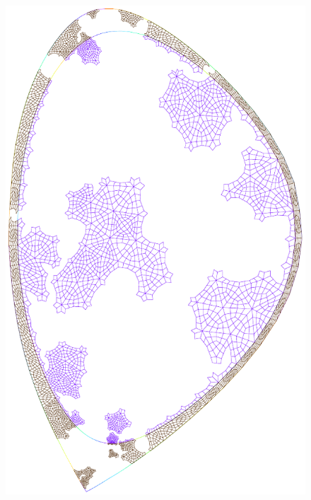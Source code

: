 \begin{figure}
{\includegraphics[scale=.5]{images/tokamak_layer_mesh_adapt_fine_2_pre.pdf}}\quad
\subfigure[{rank = 3}\label{fig:tokamak_layer_mesh_adapt_fine_3_pre}]

\end{figure}
